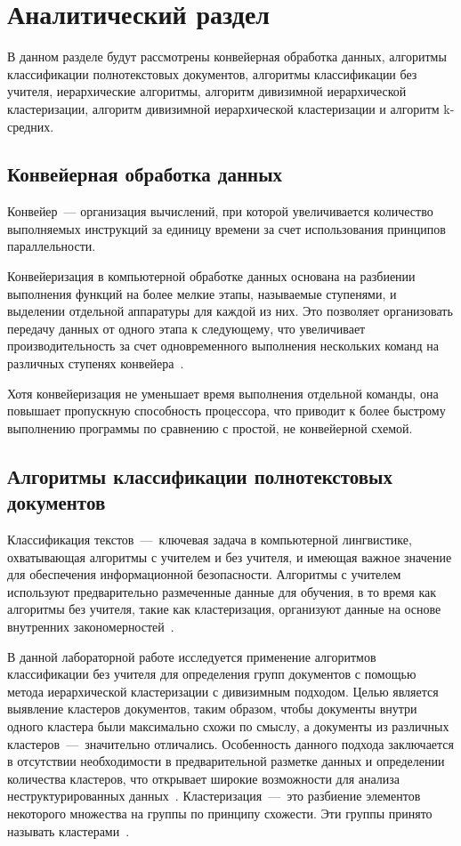 \chapter{Аналитический раздел}

В данном разделе будут рассмотрены конвейерная обработка данных, алгоритмы классификации полнотекстовых документов, алгоритмы классификации без учителя, иерархические алгоритмы, алгоритм дивизимной иерархической кластеризации, алгоритм дивизимной иерархической кластеризации и алгоритм k-средних.

\section{Конвейерная обработка данных}

Конвейер~--- организация вычислений, при которой увеличивается количество выполняемых инструкций за единицу времени за счет использования принципов параллельности.

Конвейеризация в компьютерной обработке данных основана на разбиении выполнения функций на более мелкие этапы, называемые ступенями, и выделении отдельной аппаратуры для каждой из них.
Это позволяет организовать передачу данных от одного этапа к следующему, что увеличивает производительность за счет одновременного выполнения нескольких команд на различных ступенях конвейера~\cite{conveyor}.

Хотя конвейеризация не уменьшает время выполнения отдельной команды, она повышает пропускную способность процессора, что приводит к более быстрому выполнению программы по сравнению с простой, не конвейерной схемой.


\section{Алгоритмы классификации полнотекстовых документов}

Классификация текстов~---~ключевая задача в компьютерной лингвистике, охватывающая алгоритмы с учителем и без учителя, и имеющая важное значение для обеспечения информационной безопасности.
Алгоритмы с учителем используют предварительно размеченные данные для обучения, в то время как алгоритмы без учителя, такие как кластеризация, организуют данные на основе внутренних закономерностей~\cite{main-book}.

В данной лабораторной работе исследуется применение алгоритмов классификации без учителя для определения групп документов с помощью метода иерархической кластеризации с дивизимным подходом. 
Целью является выявление кластеров документов, таким образом, чтобы документы внутри одного кластера были максимально схожи по смыслу, а документы из различных кластеров~---~значительно отличались.
Особенность данного подхода заключается в отсутствии необходимости в предварительной разметке данных и определении количества кластеров, что открывает широкие возможности для анализа неструктурированных данных~\cite{main-book}.
Кластеризация~---~это разбиение элементов некоторого множества на группы по принципу схожести. Эти группы принято называть кластерами~\cite{defcluctering}.


